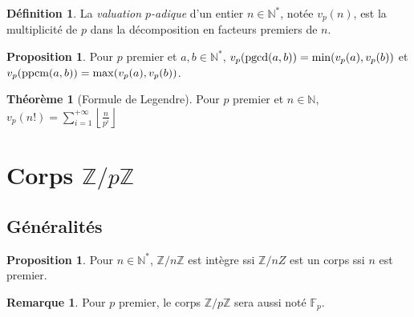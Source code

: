 \documentclass[a5paper, 10pt]{article}
\theoremstyle{definition}
\newtheorem{definition}[equation]{Définition}
\newtheorem{proposition}[equation]{Proposition}
\newtheorem{theorem}[equation]{Théorème}
\newtheorem{remark}[equation]{Remarque}
\newcounter{n}
\def\F{\mathbb{F}}
\def\Z{\mathbb{Z}}
\def\N{\mathbb{N}}
\def\pgcd{\textnormal{pgcd}}
\def\ppcm{\textnormal{ppcm}}
\begin{document}
\begin{definition}
  La \emph{valuation $p$-adique} d'un entier $n \in \N^*$, notée
  $v_p(n)$, est la multiplicité de $p$ dans la décomposition en
  facteurs premiers de $n$.
\end{definition}
\begin{proposition}
  Pour $p$ premier et $a, b \in \N^*$,
  $v_p(\pgcd(a,b)) = \min(v_p(a), v_p(b))$ et
  $v_p(\ppcm(a,b)) = \max(v_p(a), v_p(b))$.
\end{proposition}
\begin{theorem}[Formule de Legendre]
Pour $p$ premier et $n \in \N$,
$\displaystyle v_p(n!) = \sum_{i=1}^{+\infty} \left\lfloor \frac{n}{p^i} \right\rfloor$
\end{theorem}


\section{Corps $\Z/p\Z$}

\subsection{Généralités}

\begin{proposition}
  Pour $n \in \N^*$, $\Z/n\Z$ est intègre ssi $\Z/nZ$ est un corps ssi
  $n$ est premier.
\end{proposition}
\begin{remark}
  Pour $p$ premier, le corps $\Z/p\Z$ sera aussi noté $\F_p$.
\end{remark}
\end{document}
